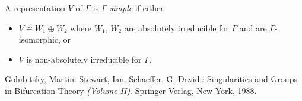 \documentclass[12pt]{article}
\begin{document}
A representation $V$ of $\Gamma$ is \emph{$\Gamma$-simple} if either
\begin{itemize}
\item $V \cong W_1 \oplus W_2$ where $W_1$, $W_2$ are absolutely irreducible for $\Gamma$ and are $\Gamma$-isomorphic, or
\item $V$ is non-absolutely irreducible for $\Gamma$.
\end{itemize}
\cite{1}
\begin{thebibliography}{1}
 Golubitsky, Martin. Stewart, Ian. Schaeffer, G. David.: Singularities and Groups in Bifurcation Theory \textit{(Volume II)}. Springer-Verlag, New York, 1988.
\end{thebibliography}
\end{document}
